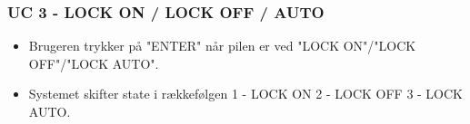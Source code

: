 \subsubsection{UC 3 - LOCK ON / LOCK OFF / AUTO}

\begin{itemize}
	\item Brugeren trykker på "ENTER" når pilen er ved "LOCK ON"/"LOCK OFF"/"LOCK AUTO".
	\item Systemet skifter state i rækkefølgen 1 - LOCK ON 2 - LOCK OFF 3 - LOCK AUTO.
\end{itemize}

%	
%	
%	
%	
%	
%	
%	
%	
%	
%	
%	
%	
